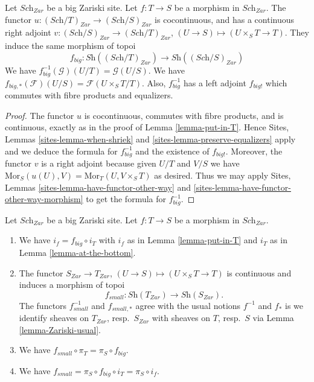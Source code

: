 \begin{lemma}
\label{lemma-morphism-big}
Let $\textit{Sch}_{Zar}$ be a big Zariski site.
Let $f : T \to S$ be a morphism in $\textit{Sch}_{Zar}$.
The functor $u : (\textit{Sch}/T)_{Zar} \to (\textit{Sch}/S)_{Zar}$
is cocontinuous, and has a continuous right adjoint
$v : (\textit{Sch}/S)_{Zar} \to (\textit{Sch}/T)_{Zar}$,
$(U \to S) \mapsto (U \times_S T \to T)$. They induce the same morphism
of topoi
$$
f_{big} :
\textit{Sh}((\textit{Sch}/T)_{Zar})
\longrightarrow
\textit{Sh}((\textit{Sch}/S)_{Zar})
$$
We have $f_{big}^{-1}(\mathcal{G})(U/T) = \mathcal{G}(U/S)$.
We have $f_{big, *}(\mathcal{F})(U/S) = \mathcal{F}(U\times_ST/T)$.
Also, $f_{big}^{-1}$ has a left adjoint $f_{big!}$ which commutes with
fibre products and equalizers.
\end{lemma}

\begin{proof}
The functor $u$ is cocontinuous, commutes with fibre products,
and is continuous, exactly as in the proof of Lemma \ref{lemma-put-in-T}.
Hence Sites, Lemmas \ref{sites-lemma-when-shriek}
and \ref{sites-lemma-preserve-equalizers}
apply and we deduce the formula
for $f_{big}^{-1}$ and the existence of $f_{big!}$. Moreover,
the functor $v$ is a right adjoint because given $U/T$ and $V/S$
we have $\text{Mor}_S(u(U), V) = \text{Mor}_T(U, V\times_S T)$
as desired. Thus we may apply
Sites, Lemmas \ref{sites-lemma-have-functor-other-way} and
\ref{sites-lemma-have-functor-other-way-morphism}  to get the
formula for $f_{big}^{-1}$.
\end{proof}

\begin{lemma}
\label{lemma-morphism-big-small}
Let $\textit{Sch}_{Zar}$ be a big Zariski site.
Let $f : T \to S$ be a morphism in $\textit{Sch}_{Zar}$.
\begin{enumerate}
\item We have $i_f = f_{big} \circ i_T$ with $i_f$ as in
Lemma \ref{lemma-put-in-T} and $i_T$ as in Lemma \ref{lemma-at-the-bottom}.
\item The functor $S_{Zar} \to T_{Zar}$,
$(U \to S) \mapsto (U \times_S T \to T)$ is continuous and induces
a morphism of topoi
$$
f_{small} :
\textit{Sh}(T_{Zar})
\longrightarrow
\textit{Sh}(S_{Zar}).
$$
The functors $f_{small}^{-1}$ and $f_{small, *}$ agree with
the usual notions $f^{-1}$ and $f_*$ is we identify sheaves
on $T_{Zar}$, resp.\ $S_{Zar}$ with sheaves on $T$, resp.\ $S$
via Lemma \ref{lemma-Zariski-usual}.
\item We have $f_{small} \circ \pi_T = \pi_S \circ f_{big}$.
\item We have $f_{small} = \pi_S \circ f_{big} \circ i_T = \pi_S \circ i_f$.
\end{enumerate}
\end{lemma}

